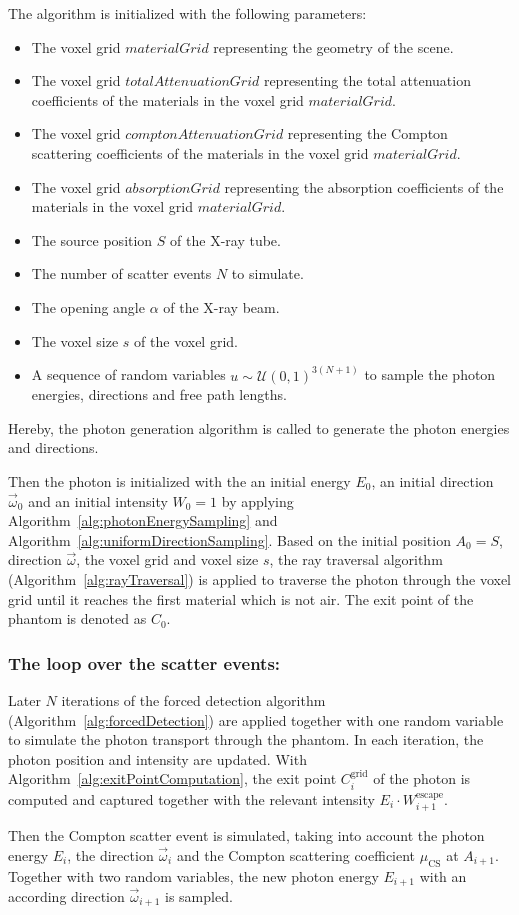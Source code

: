 The algorithm is initialized with the following parameters:
\begin{itemize}
    \item The voxel grid $materialGrid$ representing the geometry of the scene.
    \item The voxel grid $totalAttenuationGrid$ representing the total
    attenuation coefficients of the materials in the voxel grid $materialGrid$.
    \item The voxel grid $comptonAttenuationGrid$ representing the Compton
    scattering coefficients of the materials in the voxel grid $materialGrid$.
    \item The voxel grid $absorptionGrid$ representing the absorption
    coefficients of the materials in the voxel grid $materialGrid$.
    \item The source position $S$ of the X-ray tube.
    \item The number of scatter events $N$ to simulate.
    \item The opening angle $\alpha$ of the X-ray beam.
    \item The voxel size $s$ of the voxel grid.
    \item A sequence of random variables $u \sim \mathcal{U}(0, 1)^{3(N+1)}$ to
    sample the photon energies, directions and free path lengths.
\end{itemize}

Hereby, the photon generation algorithm is called to generate the photon energies and directions.

Then the photon is initialized with the an initial energy $E_0$, an initial
direction $\vec{\omega}_0$ and an initial intensity $W_0=1$ by applying
Algorithm~\ref{alg:photonEnergySampling} and
Algorithm~\ref{alg:uniformDirectionSampling}. Based on the initial position $A_0
= S$, direction $\vec{\omega}$, the voxel grid and voxel size $s$, the ray
traversal algorithm (Algorithm~\ref{alg:rayTraversal}) is applied to traverse
the photon through the voxel grid until it reaches the first material which is
not air. The exit point of the phantom is denoted as $C_0$.

\subsubsection*{The loop over the scatter events:}

Later $N$ iterations of the forced detection algorithm
(Algorithm~\ref{alg:forcedDetection}) are applied together with one random
variable to simulate the photon transport through the phantom. In each
iteration, the photon position and intensity are updated. With
Algorithm~\ref{alg:exitPointComputation}, the exit point $C_i^\text{grid}$ of
the photon is computed and captured together with the relevant intensity $E_i
\cdot W^{\text{escape}}_{i+1}$.

Then the Compton scatter event is simulated, taking into account the photon
energy $E_i$, the direction $\vec{\omega}_i$ and the Compton scattering
coefficient $\mu_{\text{CS}}$ at $A_{i+1}$. Together with two random variables,
the new photon energy $E_{i+1}$ with an according direction $\vec{\omega}_{i+1}$
is sampled.
